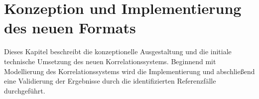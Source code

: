 \chapter{Konzeption und Implementierung des neuen Formats}\label{ch:modeling-implmentation}

Dieses Kapitel beschreibt die konzeptionelle Ausgestaltung und die initiale technische Umsetzung des neuen Korrelationssystems.
Beginnend mit Modellierung des Korrelationssystems wird die Implementierung und abschließend eine Validierung der Ergebnisse durch die identifizierten Referenzfälle durchgeführt.






